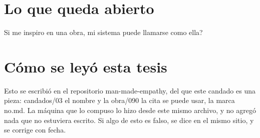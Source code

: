 \documentclass[11pt,a4paper]{article}
\begin{document}
\section{Lo que queda abierto}
\textquestiondown{}Si me inspiro en una obra, mi sistema puede llamarse como ella?

\section*{Cómo se leyó esta tesis}
Esto se escribió en el repositorio man-made-empathy, del que este candado es una pieza: candados/03 el nombre y la obra/090 la cita se puede usar, la marca no.md. La máquina que lo compuso lo hizo desde este mismo archivo, y no agregó nada que no estuviera escrito. Si algo de esto es falso, se dice en el mismo sitio, y se corrige con fecha.
\end{document}
